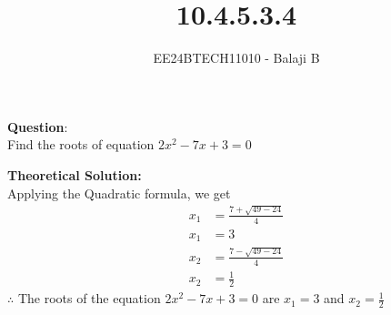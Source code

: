 \documentclass[journal]{IEEEtran}
\begin{document}

\vspace{3cm}

\title{10.4.5.3.4}
\author{EE24BTECH11010 - Balaji B}
{\let\newpage\relax\maketitle}

\renewcommand{\thefigure}{\theenumi}
\renewcommand{\thetable}{\theenumi}
\setlength{\intextsep}{10pt} %


\renewcommand{\thetable}{\theenumi}


\textbf{Question}:\\
Find the roots of equation $2x^2 - 7x + 3 = 0$

\textbf{Theoretical Solution:}\\
Applying the Quadratic formula, we get
\begin{align}
    x_1 &= \frac{7 + \sqrt{49 - 24}}{4} \\ x_1 &= 3 \\ 
    x_2 &= \frac{7 - \sqrt{49 - 24}}{4}\\ x_2 &= \frac{1}{2} 
\end{align}
$\therefore $ The roots of the equation $2x^2 - 7x + 3 = 0$ are $x_1 = 3$ and $x_2 = \frac{1}{2}$\\
 
\end{document}
